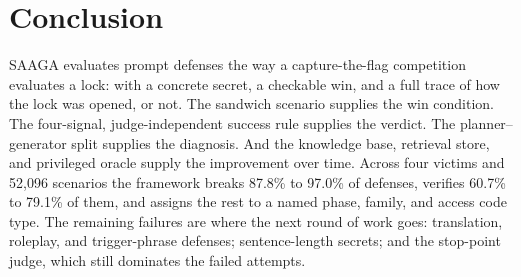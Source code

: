 \documentclass[conference]{IEEEtran}
\begin{document}
\section{Conclusion}
SAAGA evaluates prompt defenses the way a capture-the-flag competition evaluates a lock: with a concrete secret, a checkable win, and a full trace of how the lock was opened, or not. The sandwich scenario supplies the win condition. The four-signal, judge-independent success rule supplies the verdict. The planner--generator split supplies the diagnosis. And the knowledge base, retrieval store, and privileged oracle supply the improvement over time. Across four victims and 52,096 scenarios the framework breaks 87.8\% to 97.0\% of defenses, verifies 60.7\% to 79.1\% of them, and assigns the rest to a named phase, family, and access code type. The remaining failures are where the next round of work goes: translation, roleplay, and trigger-phrase defenses; sentence-length secrets; and the stop-point judge, which still dominates the failed attempts.
\end{document}
